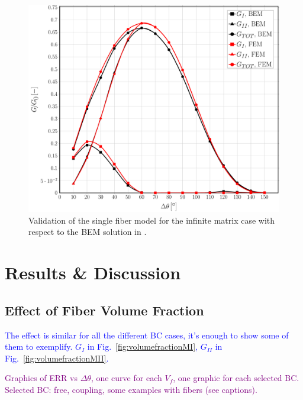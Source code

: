 \documentclass[review]{elsarticle}
\begin{document}
\begin{figure}[!h]
\centering
\includegraphics[width=\textwidth]{validation-VCCT.pdf}
\caption{Validation of the single fiber model for the infinite matrix case with respect to the BEM solution in \cite{}.}\label{fig:validation}
\end{figure}

\section{Results \& Discussion}

\subsection{Effect of Fiber Volume Fraction}

\textcolor{blue}{The effect is similar for all the different BC cases, it's enough to show some of them to exemplify. $G_{I}$ in Fig.~\ref{fig:volumefractionMI}, $G_{II}$ in Fig.~\ref{fig:volumefractionMII}.}

\textcolor{purple}{Graphics of ERR vs $\Delta\theta$, one curve for each $V_{f}$, one graphic for each selected BC. Selected BC: free, coupling, some examples with fibers (see captions).}
\end{document}
